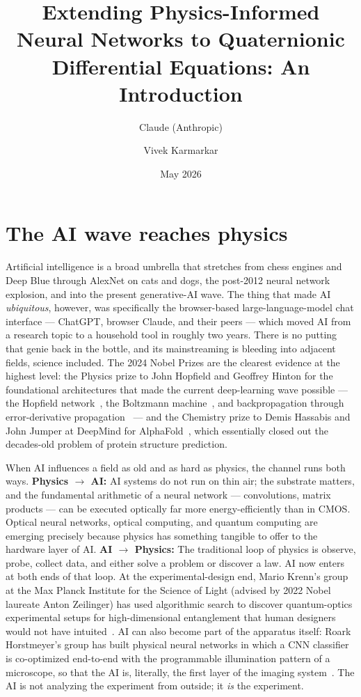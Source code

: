 \documentclass[11pt]{article}
\title{Extending Physics-Informed Neural Networks to Quaternionic Differential Equations: An Introduction}
\author{Claude (Anthropic) \and Vivek Karmarkar}
\date{May 2026}
\begin{document}
\maketitle

\section{The AI wave reaches physics}

Artificial intelligence is a broad umbrella that stretches from chess engines and Deep Blue through AlexNet on cats and dogs, the post-2012 neural network explosion, and into the present generative-AI wave. The thing that made AI \emph{ubiquitous}, however, was specifically the browser-based large-language-model chat interface --- ChatGPT, browser Claude, and their peers --- which moved AI from a research topic to a household tool in roughly two years. There is no putting that genie back in the bottle, and its mainstreaming is bleeding into adjacent fields, science included. The 2024 Nobel Prizes are the clearest evidence at the highest level: the Physics prize to John Hopfield and Geoffrey Hinton for the foundational architectures that made the current deep-learning wave possible --- the Hopfield network~\cite{Hopfield1982}, the Boltzmann machine~\cite{AckleyHinton1985}, and backpropagation through error-derivative propagation~\cite{RumelhartHinton1986} --- and the Chemistry prize to Demis Hassabis and John Jumper at DeepMind for AlphaFold~\cite{Jumper2021}, which essentially closed out the decades-old problem of protein structure prediction.

When AI influences a field as old and as hard as physics, the channel runs both ways. \textbf{Physics $\rightarrow$ AI:} AI systems do not run on thin air; the substrate matters, and the fundamental arithmetic of a neural network --- convolutions, matrix products --- can be executed optically far more energy-efficiently than in CMOS. Optical neural networks, optical computing, and quantum computing are emerging precisely because physics has something tangible to offer to the hardware layer of AI. \textbf{AI $\rightarrow$ Physics:} The traditional loop of physics is observe, probe, collect data, and either solve a problem or discover a law. AI now enters at both ends of that loop. At the experimental-design end, Mario Krenn's group at the Max Planck Institute for the Science of Light (advised by 2022 Nobel laureate Anton Zeilinger) has used algorithmic search to discover quantum-optics experimental setups for high-dimensional entanglement that human designers would not have intuited~\cite{Krenn2016}. AI can also become part of the apparatus itself: Roark Horstmeyer's group has built physical neural networks in which a CNN classifier is co-optimized end-to-end with the programmable illumination pattern of a microscope, so that the AI is, literally, the first layer of the imaging system~\cite{Horstmeyer2017}. The AI is not analyzing the experiment from outside; it \emph{is} the experiment.
\end{document}

